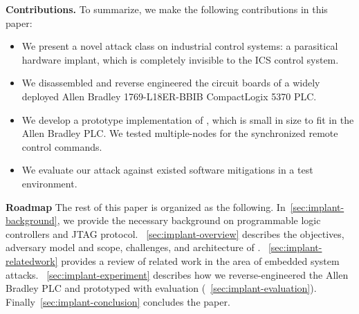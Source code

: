 \textbf{Contributions.} To summarize, we make the following contributions in this paper:
\begin{itemize}[leftmargin=*]
	\item We present a novel attack class on industrial control systems: a parasitical hardware implant, which is completely invisible to the ICS control system.
	\item We disassembled and reverse engineered the circuit boards of a widely deployed Allen Bradley 1769-L18ER-BBIB CompactLogix 5370 PLC. 
	\item We develop a prototype implementation of \name, which is small in size to fit in the Allen Bradley PLC. We tested multiple-nodes for the synchronized remote control commands. 
	\item We evaluate our attack against existed software mitigations in a test environment.

\end{itemize}



\textbf{Roadmap}
The rest of this paper is organized as the following. In~\autoref{sec:implant-background}, we provide the necessary background on programmable logic controllers and JTAG protocol. ~\autoref{sec:implant-overview} describes the objectives, adversary model and scope, challenges, and architecture of \name. ~\autoref{sec:implant-relatedwork} provides a review of related work in the area of embedded system attacks. ~\autoref{sec:implant-experiment} describes how we reverse-engineered the Allen Bradley PLC and prototyped \name with evaluation (~\autoref{sec:implant-evaluation}).  Finally~\autoref{sec:implant-conclusion} concludes the paper.

